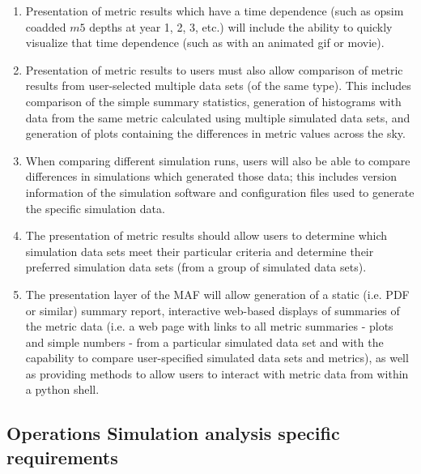 \documentclass[11pt, preprint]{aastex}
\begin{document}
\begin{enumerate}
{  all metrics from a particular data set. This includes sky plots,
  histograms, and simple summary statistics, from multiple metrics.}
\item{Presentation of metric results which have a time dependence
  (such as opsim coadded $m5$ depths at year 1, 2, 3, etc.) will include the
  ability to quickly visualize that time dependence (such as with an
  animated gif or movie). }
\item{Presentation of metric results to users must also allow
  comparison of metric results from user-selected multiple
  data sets (of the same type). This includes comparison of the simple summary
  statistics, generation of histograms with data from the same metric
  calculated using multiple simulated data sets, and generation of
  plots containing the differences in metric values across the
  sky. }
\item{When comparing different simulation runs, users will also be
  able to compare differences in simulations which generated those
  data; this includes version information of the simulation software
  and configuration files used to generate the specific simulation
  data.}
\item{The presentation of metric results should allow users to
  determine which simulation data sets meet their particular criteria
  and determine their preferred simulation data sets (from a group of
  simulated data sets). }
\item{The presentation layer of the MAF will allow generation of a 
static (i.e. PDF or similar) summary report, interactive web-based displays
of summaries of the metric data (i.e. a web page with links to all metric summaries - plots and simple numbers - from a particular
simulated data set and with the capability to compare user-specified simulated data sets and metrics),
as well as providing methods to allow users to interact with metric data from within a python shell. }
\end{enumerate}

\subsection{Operations Simulation analysis specific requirements}
\end{document}
